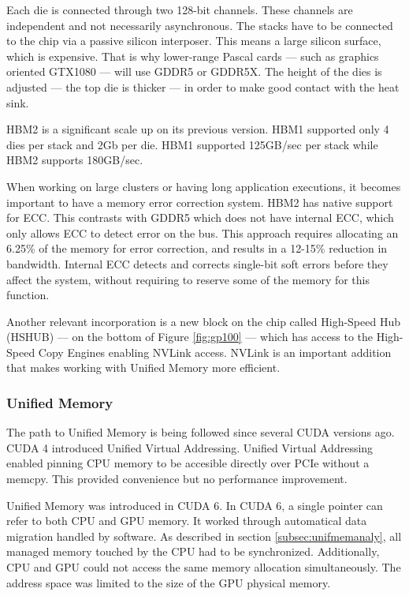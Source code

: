 Each die is connected through two 128-bit channels.
These channels are independent and not necessarily asynchronous.
The stacks have to be connected to the chip via a passive silicon interposer.
This means a large silicon surface, which is expensive.
That is why lower-range Pascal cards --- such as graphics oriented GTX1080 --- will use GDDR5 or GDDR5X.
The height of the dies is adjusted --- the top die is thicker --- in order to make good contact with the heat sink.

HBM2 is a significant scale up on its previous version.
HBM1 supported only 4 dies per stack and 2Gb per die.
HBM1 supported 125GB/sec per stack while HBM2 supports 180GB/sec.

When working on large clusters or having long application executions, it becomes important to have a memory error correction system.
HBM2 has native support for ECC.
This contrasts with GDDR5 which does not have internal ECC, which only allows ECC to detect error on the bus.
This approach requires allocating an 6.25\% of the memory for error correction, and results in a 12-15\% reduction in bandwidth.
Internal ECC detects and corrects single-bit soft errors before they affect the system, without requiring to reserve some of the memory for this function.

Another relevant incorporation is a new block on the chip called High-Speed Hub (HSHUB) --- on the bottom of Figure \ref{fig:gp100} --- which has access to the High-Speed Copy Engines enabling NVLink access.
NVLink is an important addition that makes working with Unified Memory more efficient.

\subsubsection{Unified Memory}
The path to Unified Memory is being followed since several CUDA versions ago.
CUDA 4 introduced Unified Virtual Addressing.
Unified Virtual Addressing enabled pinning CPU memory to be accesible directly over PCIe without a memcpy.
This provided convenience but no performance improvement.

Unified Memory was introduced in CUDA 6.
In CUDA 6, a single pointer can refer to both CPU and GPU memory.
It worked through automatical data migration handled by software.
As described in section \ref{subsec:unifmemanaly}, all managed memory touched by the CPU had to be synchronized.
Additionally, CPU and GPU could not access the same memory allocation simultaneously.
The address space was limited to the size of the GPU physical memory.

